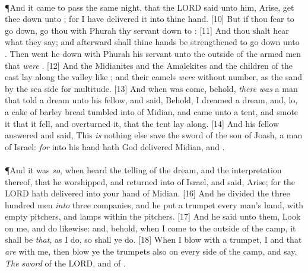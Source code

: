 \\
\P \textcolor[cmyk]{0.99998,1,0,0}{And it came to pass the same night, that the LORD said unto him, Arise, get thee down unto ; for I have delivered it into thine hand.}
[10] \textcolor[cmyk]{0.99998,1,0,0}{But if thou fear to go down, go thou with Phurah thy servant down to :}
[11] \textcolor[cmyk]{0.99998,1,0,0}{And thou shalt hear what they say; and afterward shall thine hands be strengthened to go down unto . Then went he down with Phurah his servant unto the outside of the armed men that \emph{were}  .}
[12] \textcolor[cmyk]{0.99998,1,0,0}{And the Midianites and the Amalekites and  the children of the east lay along  the valley like ; and their camels \emph{were} without number, as the sand by the sea side for multitude.}
[13] \textcolor[cmyk]{0.99998,1,0,0}{And when  was come, behold, \emph{there} \emph{was} a man that told a dream unto his fellow, and said, Behold, I dreamed a dream, and, lo, a cake of barley bread tumbled into  of Midian, and came unto a tent, and smote it that it fell, and overturned it, that the tent lay along.}
[14] \textcolor[cmyk]{0.99998,1,0,0}{And his fellow answered and said, This \emph{is} nothing else save the sword of  the son of Joash, a man of Israel: \emph{for} into his hand hath God delivered Midian, and  .}\\
\\
\P \textcolor[cmyk]{0.99998,1,0,0}{And it was \emph{so}, when  heard the telling of the dream, and the interpretation thereof, that he worshipped, and returned into  of Israel, and said, Arise; for the LORD hath delivered into your hand  of Midian.}
[16] \textcolor[cmyk]{0.99998,1,0,0}{And he divided the three hundred men \emph{into} three companies, and he put a trumpet  every man's hand, with empty pitchers, and lamps within the pitchers.}
[17] \textcolor[cmyk]{0.99998,1,0,0}{And he said unto them, Look on me, and do likewise: and, behold, when I come to the outside of the camp, it shall be \emph{that}, as I do, so shall ye do.}
[18] \textcolor[cmyk]{0.99998,1,0,0}{When I blow with a trumpet, I and  that \emph{are} with me, then blow ye the trumpets also on every side of  the camp, and say, \emph{The} \emph{sword} of the LORD, and of .}\\
